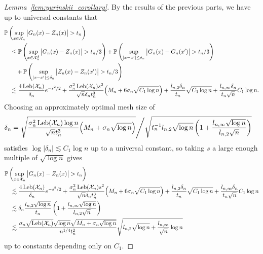 \begin{proof}[Lemma~\ref{lem:yurinskii_corollary}]
  By the results of the previous parts,
  we have up to universal constants that
  \begin{align*}
    &\mathbb{P}\left(
      \sup_{x \in \mathcal{X}_n}
      \big|
      G_n(x) - Z_n(x)
      \big|
      > t_n
    \right) \\
    &\quad\leq
    \mathbb{P}\left(
      \sup_{x \in \mathcal{X}_n^\delta}
      \big|
      G_n(x) - Z_n(x)
      \big|
      > t_n / 3
    \right)
    + \mathbb{P}\left(
      \sup_{|x-x'| \leq \delta_n}
      \big|
      G_n(x) - G_n(x')
      \big|
      > t_n / 3
    \right) \\
    &\qquad+
    \mathbb{P}\left(
      \sup_{|x - x'| \leq \delta_n}
      \big|
      Z_n(x) - Z_n(x')
      \big|
      > t_n / 3
    \right) \\
    &\quad\lesssim
    \frac{4 \operatorname{Leb}(\mathcal{X}_n)}{\delta_n}
    e^{-s^2/2}
    + \frac{\sigma_n^2 \operatorname{Leb}(\mathcal{X}_n) s^2}{\sqrt n \delta_n t_n^3}
    \Big(M_n + 6 \sigma_n \sqrt{C_1 \log n}\Big)
    + \frac{l_{n,2} \delta_n}{t_n}
    \sqrt{C_1 \log n}
    + \frac{l_{n,\infty} \delta_n}{t_n \sqrt n} C_1 \log n.
  \end{align*}
  Choosing an approximately optimal mesh size of
  \begin{align*}
    \delta_n
    &=
    \sqrt{
      \frac{\sigma_n^2 \operatorname{Leb}(\mathcal{X}_n) \log n}{\sqrt n t_n^3}
      \Big(M_n + \sigma_n \sqrt{\log n}\Big)
    } \Bigg/
    \sqrt{
    t_n^{-1}
    l_{n,2}
    \sqrt{\log n}
    \left(
      1 + \frac{l_{n,\infty} \sqrt{\log n}}{l_{n,2} \sqrt{n}}
    \right)
    }
  \end{align*}
  satisfies $\log |\delta_n| \lesssim C_1 \log n$
  up to a universal constant,
  so taking $s$ a large enough multiple of $\sqrt{\log n}$ gives
  \begin{align*}
    &\mathbb{P}\left(
      \sup_{x \in \mathcal{X}_n}
      \big|
      G_n(x) - Z_n(x)
      \big|
      > t_n
    \right) \\
    &\quad\lesssim
    \frac{4 \operatorname{Leb}(\mathcal{X}_n)}{\delta_n}
    e^{-s^2/2}
    + \frac{\sigma_n^2 \operatorname{Leb}(\mathcal{X}_n) s^2}{\sqrt n \delta_n t_n^3}
    \Big(M_n + 6 \sigma_n \sqrt{C_1 \log n}\Big)
    + \frac{l_{n,2} \delta_n}{t_n}
    \sqrt{C_1 \log n}
    + \frac{l_{n,\infty} \delta_n}{t_n \sqrt n} C_1 \log n \\
    &\quad\lesssim
    \delta_n
    \frac{l_{n,2} \sqrt {\log n}}{t_n}
    \left( 1 + \frac{l_{n,\infty} \sqrt{\log n}}{l_{n,2} \sqrt n} \right) \\
    &\quad\lesssim
    \frac{\sigma_n \sqrt{\operatorname{Leb}(\mathcal{X}_n)} \sqrt{\log n}
      \sqrt{M_n + \sigma_n \sqrt{\log n}}}
    {n^{1/4} t_n^2}
    \sqrt{l_{n,2} \sqrt {\log n}
      + \frac{l_{n,\infty}}{\sqrt n} \log n}
  \end{align*}
  up to constants depending only on $C_1$.
\end{proof}

